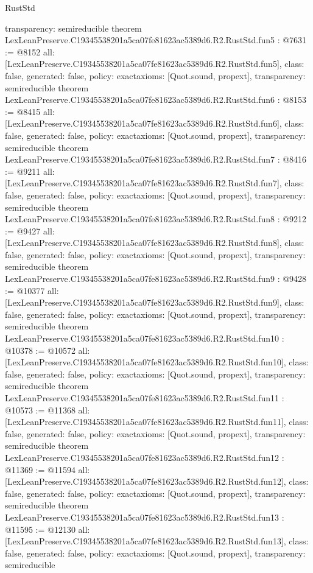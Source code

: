 \begin{lexlean}{RustStd}
\begin{coremodule}
{  transparency: semireducible
}
theorem LexLeanPreserve.C19345538201a5ca07fe81623ac5389d6.R2.RustStd.fun5 : @7631 := @8152 {
  all: [LexLeanPreserve.C19345538201a5ca07fe81623ac5389d6.R2.RustStd.fun5],
  class: false,
  generated: false,
  policy: exact{axioms: [Quot.sound, propext]},
  transparency: semireducible
}
theorem LexLeanPreserve.C19345538201a5ca07fe81623ac5389d6.R2.RustStd.fun6 : @8153 := @8415 {
  all: [LexLeanPreserve.C19345538201a5ca07fe81623ac5389d6.R2.RustStd.fun6],
  class: false,
  generated: false,
  policy: exact{axioms: [Quot.sound, propext]},
  transparency: semireducible
}
theorem LexLeanPreserve.C19345538201a5ca07fe81623ac5389d6.R2.RustStd.fun7 : @8416 := @9211 {
  all: [LexLeanPreserve.C19345538201a5ca07fe81623ac5389d6.R2.RustStd.fun7],
  class: false,
  generated: false,
  policy: exact{axioms: [Quot.sound, propext]},
  transparency: semireducible
}
theorem LexLeanPreserve.C19345538201a5ca07fe81623ac5389d6.R2.RustStd.fun8 : @9212 := @9427 {
  all: [LexLeanPreserve.C19345538201a5ca07fe81623ac5389d6.R2.RustStd.fun8],
  class: false,
  generated: false,
  policy: exact{axioms: [Quot.sound, propext]},
  transparency: semireducible
}
theorem LexLeanPreserve.C19345538201a5ca07fe81623ac5389d6.R2.RustStd.fun9 : @9428 := @10377 {
  all: [LexLeanPreserve.C19345538201a5ca07fe81623ac5389d6.R2.RustStd.fun9],
  class: false,
  generated: false,
  policy: exact{axioms: [Quot.sound, propext]},
  transparency: semireducible
}
theorem LexLeanPreserve.C19345538201a5ca07fe81623ac5389d6.R2.RustStd.fun10 : @10378 := @10572 {
  all: [LexLeanPreserve.C19345538201a5ca07fe81623ac5389d6.R2.RustStd.fun10],
  class: false,
  generated: false,
  policy: exact{axioms: [Quot.sound, propext]},
  transparency: semireducible
}
theorem LexLeanPreserve.C19345538201a5ca07fe81623ac5389d6.R2.RustStd.fun11 : @10573 := @11368 {
  all: [LexLeanPreserve.C19345538201a5ca07fe81623ac5389d6.R2.RustStd.fun11],
  class: false,
  generated: false,
  policy: exact{axioms: [Quot.sound, propext]},
  transparency: semireducible
}
theorem LexLeanPreserve.C19345538201a5ca07fe81623ac5389d6.R2.RustStd.fun12 : @11369 := @11594 {
  all: [LexLeanPreserve.C19345538201a5ca07fe81623ac5389d6.R2.RustStd.fun12],
  class: false,
  generated: false,
  policy: exact{axioms: [Quot.sound, propext]},
  transparency: semireducible
}
theorem LexLeanPreserve.C19345538201a5ca07fe81623ac5389d6.R2.RustStd.fun13 : @11595 := @12130 {
  all: [LexLeanPreserve.C19345538201a5ca07fe81623ac5389d6.R2.RustStd.fun13],
  class: false,
  generated: false,
  policy: exact{axioms: [Quot.sound, propext]},
  transparency: semireducible
}
\end{coremodule}
\end{lexlean}

